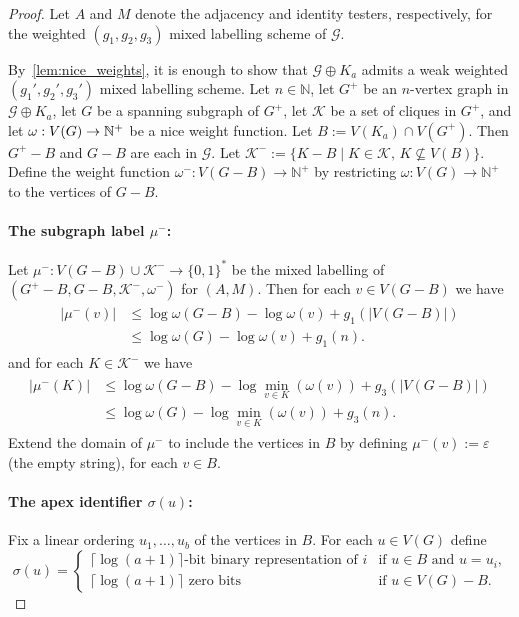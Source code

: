 \documentclass{patmorin}
\renewcommand{\le}{\leqslant}
\newcommand{\NN}{\mathbb{N}}
\newcommand{\calG}{\mathcal{G}}
\newcommand{\calK}{\mathcal{K}}
\begin{document}
\begin{proof}
    Let $A$ and $M$ denote the adjacency and identity testers, respectively, for the weighted $(g_1,g_2,g_3)$ mixed labelling scheme of $\calG$.

    By~\cref{lem:nice_weights}, it is enough to show that $\calG\oplus K_a$ admits a weak weighted $(g_1',g_2',g_3')$ mixed labelling scheme. 
    Let $n\in \NN$, 
    let $G^+$ be an $n$-vertex graph in $\calG\oplus K_a$, 
    let $G$ be a spanning subgraph of $G^+$, 
    let $\calK$ be a set of cliques in $G^+$, and 
    let $\omega:V(G)\to\mathbb{N}^+$ be a nice weight function. 
    Let $B:= V(K_a)\cap V(G^+)$. 
    Then $G^+-B$ and $G-B$ are each in $\calG$. 
    Let $\calK^-:=\{K-B \mid K\in\calK,\, K\not\subseteq V(B)\}$.
    Define the weight function $\omega^-:V(G-B)\to\NN^+$ by restricting $\omega:V(G)\to\NN^+$ to the vertices of $G-B$.

  \paragraph{\boldmath The subgraph label $\mu^-$:} 
    Let $\mu^-:V(G-B)\cup\calK^-\to \{0,1\}^*$ be the mixed labelling of $(G^+-B, G-B, \calK^-,\omega^-)$ for $(A,M)$. 
  Then for each $v\in V(G-B)$ we have
  \begin{align}
  \begin{split}
  |\mu^-(v)|
  &\le \log\omega(G-B) -\log\omega(v)+g_1(|V(G-B)|)\\
  &\le \log\omega(G)-\log\omega(v)+g_1(n).
  \end{split}
  \end{align}
  and for each $K\in\calK^-$ we have
  \begin{align}
  \label{eq:split}
  \begin{split}
  |\mu^-(K)|
  &\le \log\omega(G-B)-\log\min_{v\in K}(\omega(v))+g_3(|V(G-B)|)\\
  &\le \log\omega(G)-\log\min_{v\in K}(\omega(v))+g_3(n).
  \end{split}
  \end{align}
  Extend the domain of $\mu^-$ to include the vertices in $B$ by defining $\mu^-(v):=\varepsilon$ (the empty string), for each $v\in B$.

  \paragraph{\boldmath The apex identifier $\sigma(u)$:}
  Fix a linear ordering $u_1,\ldots,u_{b}$ of the vertices in $B$.
  For each $u\in V(G)$ define
  \[
  \sigma(u) = \begin{cases}
  \textrm{$\lceil\log(a+1)\rceil$-bit binary representation of $i$}&\textrm{if $u\in B$ and $u=u_i$,}\\
  \textrm{$\lceil\log(a+1)\rceil$ zero bits}&\textrm{if $u\in V(G)-B$.}
  \end{cases}
  \]
  

\end{proof}
\end{document}
